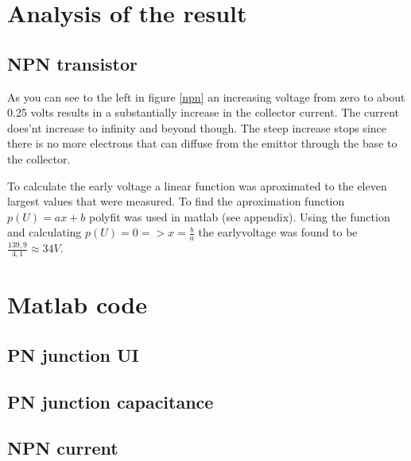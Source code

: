 \documentclass[a4paper]{article}
\begin{document}
\newpage
\section{Analysis of the result}
\subsection{NPN transistor}
As you can see to the left in figure \ref{npn} an increasing voltage from zero to about 0.25 volts results in a substantially increase in the collector current. The current does'nt increase to infinity and beyond though. The steep increase stops since there is no more electrons that can diffuse from the emittor through the base to the collector.

To calculate the early voltage a linear function was aproximated to the eleven largest values that were measured. To find the aproximation function $p(U) = ax + b$ polyfit was used in matlab (see appendix). Using the function and calculating $p(U) = 0 => x = \frac{b}{a}$ the earlyvoltage was found to be $\frac{139,9}{4,1} \approx 34V$.

\newpage
\appendix
\section{Matlab code}
\subsection{PN junction UI}

\subsection{PN junction capacitance}

\subsection{NPN current}

\end{document}

